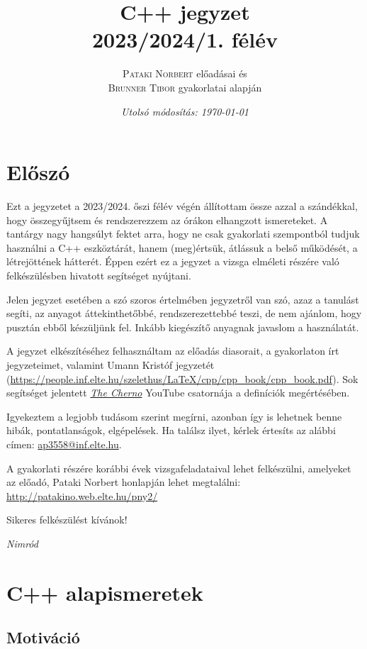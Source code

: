 \documentclass[a4paper, 11pt, oneside]{book}
\title{\textbf{C++ jegyzet} \\[+0.25em] {\Large 2023/2024/1. félév} }
\author{\textsc{Pataki Norbert} előadásai és \\ \textsc{Brunner Tibor} gyakorlatai alapján}
\date{\textit{Utolsó módosítás: \today}}
\begin{document}
	
\maketitle

\tableofcontents

\chapter*{Előszó}

Ezt a jegyzetet a 2023/2024. őszi félév végén állítottam össze azzal a szándékkal, hogy összegyűjtsem és rendszerezzem az órákon elhangzott ismereteket. A tantárgy nagy hangsúlyt fektet arra, hogy ne csak gyakorlati szempontból tudjuk használni a C++ eszköztárát, hanem (meg)értsük, átlássuk a belső működését, a létrejöttének hátterét. Éppen ezért ez a jegyzet a vizsga elméleti részére való felkészülésben hivatott segítséget nyújtani.

Jelen jegyzet esetében a szó szoros értelmében jegyzetről van szó, azaz a tanulást segíti, az anyagot áttekinthetőbbé, rendszerezettebbé teszi, de nem ajánlom, hogy pusztán ebből készüljünk fel. Inkább kiegészítő anyagnak javaslom a használatát.

A jegyzet elkészítéséhez felhasználtam az előadás diasorait, a gyakorlaton írt jegyzeteimet, valamint Umann Kristóf jegyzetét (\url{https://people.inf.elte.hu/szelethus/LaTeX/cpp/cpp_book/cpp_book.pdf}). Sok segítséget jelentett \hyperlink{https://www.youtube.com/@TheCherno}{\textit{The Cherno}} YouTube csatornája a definíciók megértésében.

Igyekeztem a legjobb tudásom szerint megírni, azonban így is lehetnek benne hibák, pontatlanságok, elgépelések. Ha találsz ilyet, kérlek értesíts az alábbi címen: \href{mailto:ap3558@inf.elte.hu}{ap3558@inf.elte.hu}.

A gyakorlati részére korábbi évek vizsgafeladataival lehet felkészülni, amelyeket az előadó, Pataki Norbert honlapján lehet megtalálni: \url{http://patakino.web.elte.hu/pny2/}

Sikeres felkészülést kívánok!

\begin{flushright}
	\textit{Nimród}
\end{flushright}

\chapter{C++ alapismeretek}

\section{Motiváció}
\end{document}
